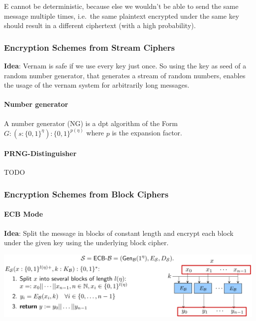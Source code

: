 E cannot be deterministic, because else we wouldn't be able to send the
same message multiple times, i.e.~the same plaintext encrypted under the
same key should result in a different ciphertext (with a high
probability).

\hypertarget{encryption-schemes-from-stream-ciphers}{%
\subsubsection{Encryption Schemes from Stream
Ciphers}\label{encryption-schemes-from-stream-ciphers}}

\textbf{Idea}: Vernam is safe if we use every key just once. So using
the key as seed of a random number generator, that generates a stream of
random numbers, enables the usage of the vernam system for arbitrarily
long messages.

\hypertarget{number-generator}{%
\paragraph{Number generator}\label{number-generator}}

A number generator (NG) is a dpt algorithm of the Form
\(G : (s: \{0,1\}^\eta) : \{0,1\}^{p(\eta)}\) where \(p\) is the
expansion factor.

\hypertarget{prng-distinguisher}{%
\paragraph{PRNG-Distinguisher}\label{prng-distinguisher}}

TODO

\hypertarget{encryption-schemes-from-block-ciphers}{%
\subsubsection{Encryption Schemes from Block
Ciphers}\label{encryption-schemes-from-block-ciphers}}

\hypertarget{ecb-mode}{%
\paragraph{ECB Mode}\label{ecb-mode}}

\textbf{Idea}: Split the message in blocks of constant length and
encrypt each block under the given key using the underlying block
cipher.

\includegraphics[width=\linewidth]{img/ecb-mode}

